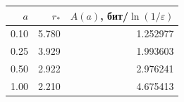 \begin{tabular}{rrr}
\toprule
$a$ & $r_*$ & $A(a)$, бит/$\ln(1/\varepsilon)$\\
\midrule
0.10 & 5.780 & 1.252977\\
0.25 & 3.929 & 1.993603\\
0.50 & 2.922 & 2.976241\\
1.00 & 2.210 & 4.675413\\
\bottomrule
\end{tabular}
